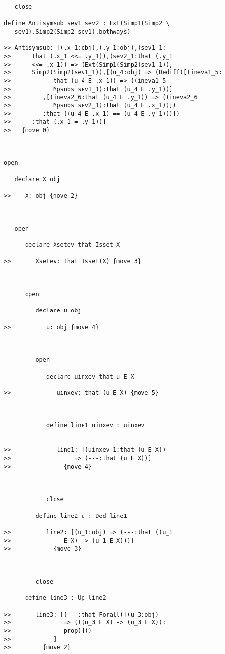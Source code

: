 \documentclass[12pt]{article}
\begin{document}
\begin{verbatim}
   close

define Antisymsub sev1 sev2 : Ext(Simp1(Simp2 \
   sev1),Simp2(Simp2 sev1),bothways)

>> Antisymsub: [(.x_1:obj),(.y_1:obj),(sev1_1:
>>      that (.x_1 <<= .y_1)),(sev2_1:that (.y_1
>>      <<= .x_1)) => (Ext(Simp1(Simp2(sev1_1)),
>>      Simp2(Simp2(sev1_1)),[(u_4:obj) => (Dediff([(ineva1_5:
>>            that (u_4 E .x_1)) => ((ineva1_5
>>            Mpsubs sev1_1):that (u_4 E .y_1))]
>>         ,[(ineva2_6:that (u_4 E .y_1)) => ((ineva2_6
>>            Mpsubs sev2_1):that (u_4 E .x_1))])
>>         :that ((u_4 E .x_1) == (u_4 E .y_1)))])
>>      :that (.x_1 = .y_1))]
>>   {move 0}



open

   declare X obj

>>    X: obj {move 2}



   open

      declare Xsetev that Isset X

>>       Xsetev: that Isset(X) {move 3}



      open

         declare u obj

>>          u: obj {move 4}



         open

            declare uinxev that u E X

>>             uinxev: that (u E X) {move 5}



            define line1 uinxev : uinxev


>>             line1: [(uinxev_1:that (u E X))
>>                  => (---:that (u E X))]
>>               {move 4}



            close

         define line2 u : Ded line1

>>          line2: [(u_1:obj) => (---:that ((u_1
>>               E X) -> (u_1 E X)))]
>>            {move 3}



         close

      define line3 : Ug line2

>>       line3: [(---:that Forall([(u_3:obj)
>>               => (((u_3 E X) -> (u_3 E X)):
>>               prop)]))
>>            ]
>>         {move 2}




\end{verbatim}
\end{document}
